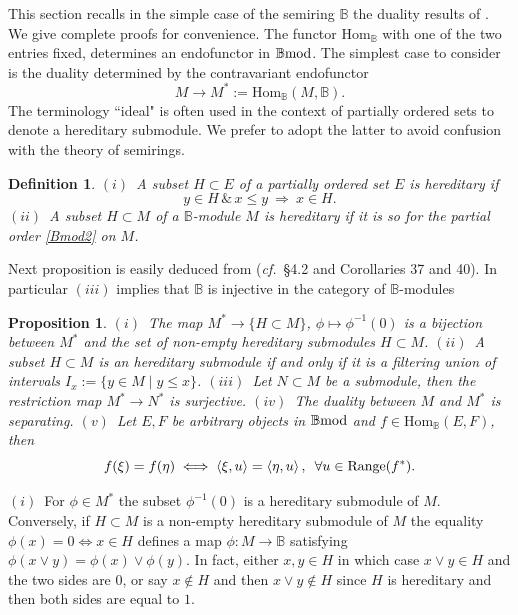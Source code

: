 \documentclass[12pt]{article}
\newtheorem{prop}[thm]{Proposition}
\newtheorem{defn}[thm]{Definition}
\def\Hom{{\rm Hom}}
\def\B{{\mathbb B}}
\def\qqq{\,,\,~\forall}
\newcommand{\cf}{{\it cf.}}
\def\Hom {{\mbox{Hom}}}
\def\bmod{{\rm \B mod}}
\begin{document}
This section recalls in the simple case of the semiring $\B$ the duality results of \cite{Cohen}. We give complete proofs for convenience.
The  functor $\Hom_\B$ with one of the two entries fixed,
determines an endofunctor in $\bmod$. The simplest case to consider is the duality 
determined by the contravariant endofunctor
\begin{equation}\label{the dual}
	M\longrightarrow M^*:=\Hom_\B(M,\B).
\end{equation}
The terminology ``ideal" is often used in the context of partially ordered sets to denote a hereditary submodule. We prefer to adopt the latter to avoid  confusion  with the theory of semirings.
\begin{defn}\label{heredit} $(i)$~A subset $H\subset E$ of a partially ordered set $E$ is hereditary if \[
y\in H\, \& \, x\leq y~\Longrightarrow~ x\in H.
\]
$(ii)$~A subset $H\subset M$ of a $\B$-module $M$ is hereditary if it is so for the partial order \eqref{Bmod2} on $M$.
	\end{defn}
	Next proposition is easily deduced from \cite{Cohen} (\cf~\S 4.2 and Corollaries 37 and 40). In particular $(iii)$ implies that $\B$ is injective in the category of $\B$-modules
\begin{prop}\label{inj1}$(i)$~The map $M^*\to \{H\subset M\}$, $\phi\mapsto\phi^{-1}(0)$ is a bijection between $M^*$ and the set of non-empty hereditary submodules $H\subset M$.\newline
$(ii)$~A subset $H\subset M$ is an hereditary submodule if and only if it is a filtering union of intervals $I_x:=\{y\in M\mid y\leq x\}$.\newline
$(iii)$~Let $N\subset M$ be a submodule, then the restriction map $M^*\to N^*$ is surjective.	
\newline
$(iv)$~The duality between $M$ and $M^*$  is separating.\newline
$(v)$~Let $E,F$ be arbitrary objects  in $\bmod$ and $f\in \Hom_\B(E,F)$, then 
   \begin{equation}\label{orthogonality1}
  	f(\xi)=f(\eta)\iff 
  	 \langle\xi,u\rangle=\langle\eta,u\rangle\qqq u\in {\rm Range}(f^*).
  \end{equation}
\end{prop}
\proof $(i)$~For $\phi\in M^*$ the subset $\phi^{-1}(0)$ is a hereditary submodule of $M$. Conversely, if $H\subset M$ is a non-empty hereditary submodule of $M$ the equality $\phi(x)=0 \iff x\in H$ defines a map $\phi:M\to \B$ satisfying $\phi(x\vee y)=\phi(x)\vee\phi(y)$. In fact, either $x,y\in H$ in which case $x\vee y\in H$ and the two sides are $0$, or say $x\notin H$ and then $x\vee y \notin H$ since $H$ is hereditary and then both sides are equal to $1$.\newline
\end{document}
